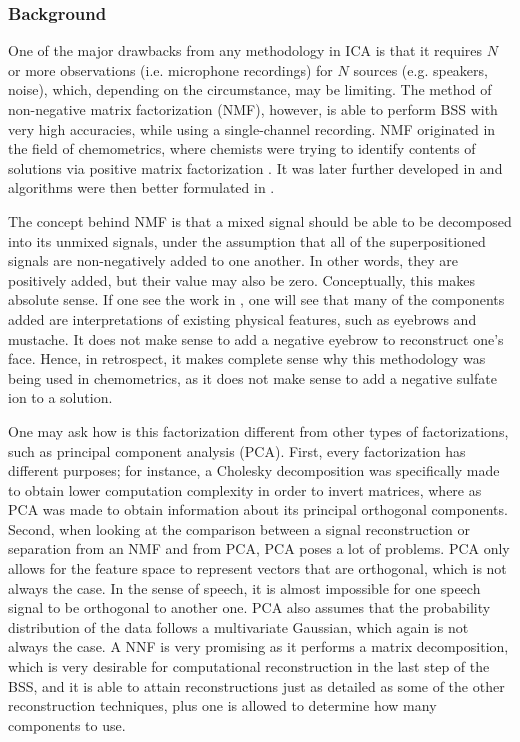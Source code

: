 \subsubsection{Background}
One of the major drawbacks from any methodology in ICA is that it requires $N$ or more observations (i.e. microphone recordings) for $N$ sources (e.g. speakers, noise), which, depending on the circumstance, may be limiting. The method of non-negative matrix factorization (NMF), however, is able to perform BSS with very high accuracies, while using a single-channel recording. NMF originated in the field of chemometrics, where chemists were trying to identify contents of solutions via positive matrix factorization \cite{pmf} \cite{pmf_chem}. It was later further developed in \cite{nmf1} and algorithms were then better formulated in \cite{nmf2}.

The concept behind NMF is that a mixed signal should be able to be decomposed into its unmixed signals, under the assumption that all of the superpositioned signals are non-negatively added to one another. In other words, they are positively added, but their value may also be zero. Conceptually, this makes absolute sense. If one see the work in \cite{nmf1}, one will see that many of the components added are interpretations of existing physical features, such as eyebrows and mustache. It does not make sense to add a negative eyebrow to reconstruct one's face. Hence, in retrospect, it makes complete sense why this methodology was being used in chemometrics, as it does not make sense to add a negative sulfate ion to a solution.

One may ask how is this factorization different from other types of factorizations, such as principal component analysis (PCA). First, every factorization has different purposes; for instance, a Cholesky decomposition was specifically made to obtain lower computation complexity in order to invert matrices, where as PCA was made to obtain information about its principal orthogonal components. Second, when looking at the comparison between a signal reconstruction or separation from an NMF and from PCA, PCA poses a lot of problems. PCA only allows for the feature space to represent vectors that are orthogonal, which is not always the case. In the sense of speech, it is almost impossible for one speech signal to be orthogonal to another one. PCA also assumes that the probability distribution of the data follows a multivariate Gaussian, which again is not always the case. A NNF is very promising as it performs a matrix decomposition, which is very desirable for computational reconstruction in the last step of the BSS, and it is able to attain reconstructions just as detailed as some of the other reconstruction techniques, plus one is allowed to determine how many components to use.

